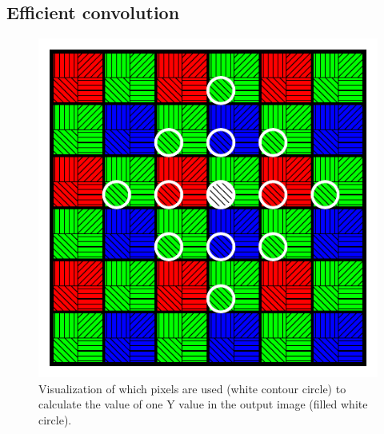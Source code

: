 \subsection{Efficient convolution}

\begin{figure}[H]
    \centering
    \includegraphics[width=.5\textwidth]{figures/polarized_image/normal_conv.pdf}
    \caption{Visualization of which pixels are used (white contour circle) to calculate the value of one Y value in the output image (filled white circle).}
    \label{fig:saperation}
\end{figure}


